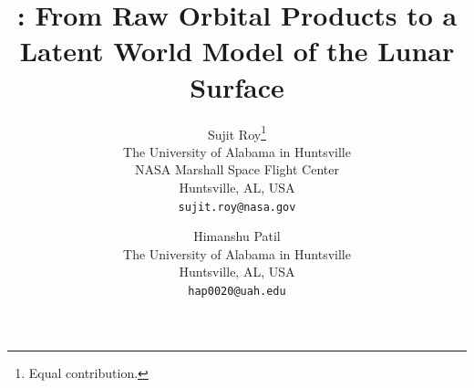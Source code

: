 \documentclass[10pt,twocolumn,letterpaper]{article}
\title{\method: From Raw Orbital Products to a Latent World Model of the Lunar Surface}
\author{Sujit Roy\thanks{Equal contribution.}\\
The University of Alabama in Huntsville\\
NASA Marshall Space Flight Center\\
Huntsville, AL, USA\\
{\tt\small sujit.roy@nasa.gov}
\and
Himanshu Patil\footnotemark[1]\\
The University of Alabama in Huntsville\\
Huntsville, AL, USA\\
{\tt\small hap0020@uah.edu}
}
\begin{document}
{\renewcommand*{\thefootnote}{\fnsymbol{footnote}}\maketitle}








{
    \small
    
    
}


\end{document}
